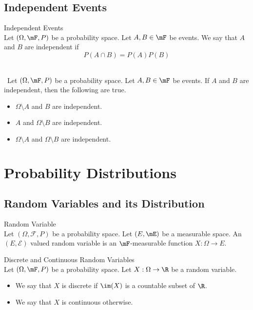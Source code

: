 \documentclass[a4paper]{article}
\begin{document}
\subsection{Independent Events}
\begin{defn}{Independent Events}{}\\
Let $(\Omega,\mF,P)$ be a probability space. Let $A,B\in\mF$ be events. We say that $A$ and $B$ are independent if $$P(A\cap B)=P(A)P(B)$$
\end{defn}

\begin{prp}{}{}\\\
Let $(\Omega,\mF,P)$ be a probability space. Let $A,B\in\mF$ be events. If $A$ and $B$ are independent, then the following are true. 
\begin{itemize}
\item $\Omega\setminus A$ and $B$ are independent. 
\item $A$ and $\Omega\setminus B$ are independent. 
\item $\Omega\setminus A$ and $\Omega\setminus B$ are independent. 
\end{itemize}
\end{prp}

\pagebreak
\section{Probability Distributions}
\subsection{Random Variables and its Distribution}
\begin{defn}{Random Variable}{}\\
Let $(\Omega,\mathcal{F},P)$ be a probability space. Let $(E,\mE)$ be a measurable space. An $(E,\mathcal{E})$ valued random variable is an $\mF$-measurable function $X:\Omega\to E$. 
\end{defn}

\begin{defn}{Discrete and Continuous Random Variables}{}\\
Let $(\Omega,\mF,P)$ be a probability space. Let $X:\Omega\to\R$ be a random variable. 
\begin{itemize}
\item We say that $X$ is discrete if $\im(X)$ is a countable subset of $\R$. 
\item We say that $X$ is continuous otherwise. 
\end{itemize}
\end{defn}
\end{document}
